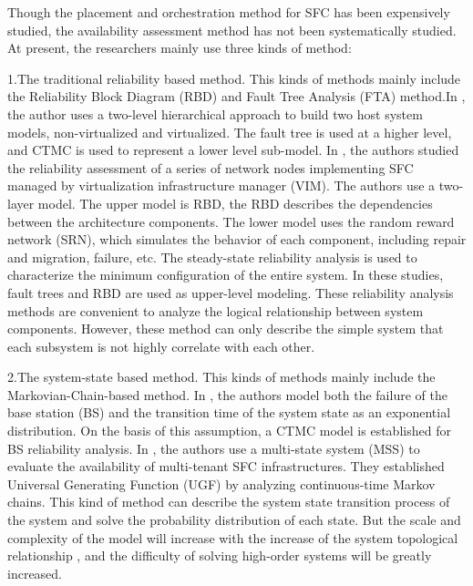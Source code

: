 \documentclass[journal]{IEEEtran}
\begin{document}
 	Though the placement and orchestration method for SFC has been expensively studied, the availability assessment method
 	has not been systematically studied. At present, the researchers mainly use three kinds of method:
 	
 	1.The traditional reliability based method. This kinds of methods mainly include the Reliability Block Diagram (RBD) and 
 	Fault Tree Analysis (FTA) method.In \cite{kim2009availability}, the author uses a two-level hierarchical approach to
 	build two host system models, non-virtualized and virtualized. The fault tree is used at a higher level, and CTMC is used to
 	represent a lower level sub-model. In \cite{di2017availability} , the authors studied the reliability assessment of a 
 	series of network nodes implementing SFC managed by virtualization infrastructure manager (VIM). The authors use a 
 	two-layer model. The upper model is RBD, the RBD describes the dependencies between the architecture components. The 
 	lower model uses the random reward network (SRN), which simulates the behavior of each component, including repair 
 	and migration, failure, etc. The steady-state reliability analysis is used to characterize the minimum configuration
 	of the entire system. In these studies, fault trees and RBD are used as upper-level	modeling. These reliability 
 	analysis methods are convenient to	analyze the logical relationship between system components. 
 	However, these method can only describe the simple system that each subsystem is not highly correlate with each other.
 	 
 	2.The system-state based method. This kinds of methods mainly include the Markovian-Chain-based method.
 	In \cite{farooq2015continuous}, the authors model both the failure of the base station (BS) and the transition time of the system state as an
 	exponential distribution. On the basis of this assumption, a CTMC model is established for BS reliability analysis. 
 	In \cite{di2018availability}, the authors use a multi-state system (MSS) to evaluate the availability of multi-tenant SFC infrastructures.
 	They established Universal Generating Function (UGF) by analyzing continuous-time Markov chains.
 	This kind of method can describe the system state transition process of the system and solve the probability distribution of each state. But the 
 	scale and complexity of the model will increase with the increase of the 
 	system topological relationship , and the difficulty of solving high-order systems will be greatly increased.
 	 
\end{document}
